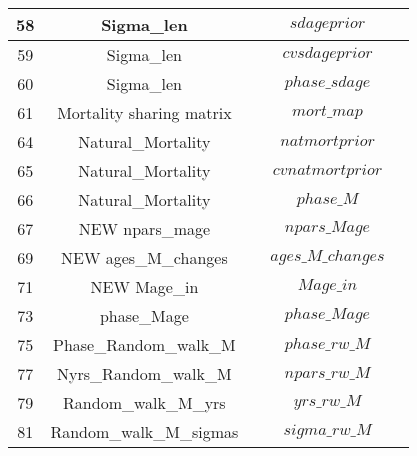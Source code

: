 \documentclass{article}
\begin{document}
\begin{tabular}{| c | c | c | c | c |}
58 &  Sigma\_len  &   &  
 $sdageprior$ &\\ \hline
59 &  Sigma\_len  &   & $cvsdageprior$ &\\ \hline
60 &  Sigma\_len  &   & $phase\_sdage$  &\\ \hline
61 &  Mortality sharing matrix  &   & $mort\_map$  &\\ \hline
64 &  Natural\_Mortality  &   & $natmortprior$ &\\ \hline
65 &  Natural\_Mortality  &   & $cvnatmortprior$ &\\ \hline
66 &  Natural\_Mortality  &   & $phase\_M$  &\\ \hline
67 &  NEW npars\_mage  &   & $npars\_Mage$ &\\ \hline
69 &  NEW ages\_M\_changes  &   & $ages\_M\_changes$ &\\ \hline
71 &  NEW Mage\_in  &   & $Mage\_in$  &\\ \hline
73 &  phase\_Mage  &   &  $phase\_Mage$ &\\ \hline
75 &  Phase\_Random\_walk\_M	  &   & $phase\_rw\_M$ &\\ \hline
77 &  Nyrs\_Random\_walk\_M  &   & $npars\_rw\_M$ &\\ \hline
79 &  Random\_walk\_M\_yrs	  &   & $yrs\_rw\_M$ &\\ \hline
81 &  Random\_walk\_M\_sigmas  &   & $sigma\_rw\_M$  &\\ \hline

\end{tabular} 
\end{document}
